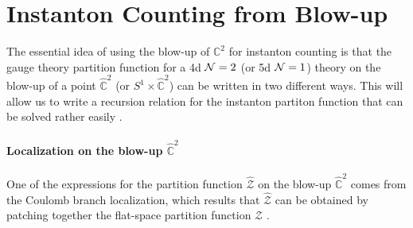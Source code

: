 \documentclass[letterpaper, 11pt]{article}
\def\IC{\mathbb{C}}
\def\CN{{\cal N}}
\begin{document}

\section{Instanton Counting from Blow-up} \label{sec:blowup}



The essential idea of using the blow-up of ${\IC}^2$ for instanton counting is that the gauge theory partition function for a 4d $\CN=2$ (or 5d $\CN=1$) theory on the blow-up of a point $\hat{\IC}^2$ (or $S^1 \times \hat{\IC}^2$) can be written in two different ways. This will allow us to write a recursion relation for the instanton partiton function that can be solved rather easily \cite{Nakajima:2003pg, Nakajima:2003uh,Nakajima:2005fg, Keller:2012da}. 






\paragraph{Localization on the blow-up $\hat{\IC}^2$}

One of the expressions for the partition function $\hat{\mathcal{Z}}$ on the blow-up $\hat{\IC}^2$ comes from the Coulomb branch localization, which results that $\hat{\mathcal{Z}}$ can be obtained by patching together the flat-space partition function $\mathcal Z$ \cite{Nekrasov:2003vi}.
\end{document}
